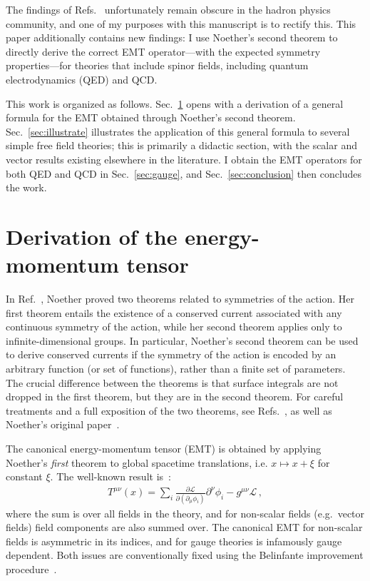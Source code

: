 \documentclass[prd,preprint,
  showpacs,showkeys,lengthcheck,
  nofootinbib,tightenlines,onecolumn,notitlepage,
  preprintnumbers,superscriptaddress]{revtex4-1}
\newcommand{\Lag}{\ensuremath{\mathscr{L}}}
\newcommand{\dx}{\ensuremath{\xi}}
\begin{document}
The findings of
Refs.~\cite{Bessel:1921emt,Felsager:1981iy,Munoz:1996wp,GamboaSaravi:2002vos,GamboaSaravi:2003aq,Montesinos:2006th}
unfortunately remain obscure in the hadron physics community,
and one of my purposes with this manuscript is to rectify this.
This paper additionally contains new findings:
I use Noether's second theorem to directly derive the correct
EMT operator---with the expected symmetry properties---for theories
that include spinor fields,
including quantum electrodynamics (QED) and QCD.

This work is organized as follows.
Sec.~\ref{sec:formalism} opens with a derivation of a general formula
for the EMT obtained through Noether's second theorem.
Sec.~\ref{sec:illustrate}
illustrates the application of this general formula
to several simple free field theories;
this is primarily a didactic section,
with the scalar and vector results existing elsewhere in the literature.
I obtain the EMT operators for both QED and QCD
in Sec.~\ref{sec:gauge},
and Sec.~\ref{sec:conclusion} then concludes the work.



\section{Derivation of the energy-momentum tensor}
\label{sec:formalism}

In Ref.~\cite{Noether:1918zz},
Noether proved two theorems related to symmetries of the action.
Her first theorem entails the existence of a conserved current associated
with any continuous symmetry of the action,
while her second theorem applies only to infinite-dimensional groups.
In particular, Noether's second theorem can be used to derive conserved currents
if the symmetry of the action is encoded by an arbitrary function
(or set of functions), rather than a finite set of parameters.
The crucial difference between the theorems is that surface integrals
are not dropped in the first theorem, but they are in the second theorem.
For careful treatments and a full exposition of the two theorems,
see Refs.~\cite{Brading:2000hc,Kosyakov:2007qc,DeHaro:2021gdv},
as well as Noether's original paper~\cite{Noether:1918zz}.

The canonical energy-momentum tensor (EMT) is obtained by applying
Noether's \emph{first} theorem to global spacetime translations,
i.e. $x \mapsto x + \dx$ for constant $\dx$.
The well-known result is~\cite{Itzykson:1980rh,Peskin:1995ev,Weinberg:1995mt,Kosyakov:2007qc}:
\begin{align}
  \label{eqn:emt:canonical}
  T^{\mu\nu}(x)
  =
  \sum_i
  \frac{\partial\Lag}{\partial (\partial_\mu \phi_i)} \partial^\nu \phi_i
  -
  g^{\mu\nu} \Lag
  \,,
\end{align}
where the sum is over all fields in the theory,
and for non-scalar fields (e.g.\ vector fields)
field components are also summed over.
The canonical EMT for non-scalar fields is asymmetric in its indices,
and for gauge theories is infamously gauge dependent.
Both issues are conventionally fixed using the Belinfante
improvement procedure~\cite{Belinfante:1939emt}.
\end{document}
